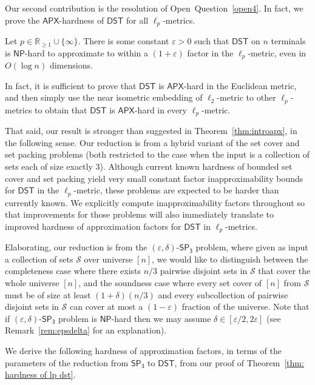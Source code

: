 \documentclass{theoretics}
\newcommand{\1}{\textbf{1}}
\newcommand{\setpT}{$\mathsf{SP_3}$\xspace}
\newcommand{\dst}{$\mathsf{DST}$\xspace}
\newcommand{\np}{$\mathsf{NP}$\xspace}
\newcommand{\apx}{$\mathsf{APX}$\xspace}
\begin{document}
 
Our second contribution is the resolution of Open~Question~\ref{open4}. In fact, we prove the \apx-hardness of \dst for all $\ell_p$-metrics. 

\begin{theorem}
   \label{thm:introapx} Let $p\in \mathbb{R}_{\ge 1}\cup\{\infty\}$. There is some constant $\varepsilon>0$ such that \dst on $n$ terminals is \np-hard to approximate to within a $(1+\varepsilon)$ factor in the $\ell_p$-metric, even in $O(\log n)$ dimensions. 
\end{theorem}

In fact, it is sufficient to prove that \dst is \apx-hard in the Euclidean metric, and then simply use the near isometric embedding of $\ell_2$-metric to other $\ell_p$-metrics \cite{Racke_2006} to obtain that  \dst is \apx-hard in every  $\ell_p$-metric. 


That said, our result is stronger than suggested in Theorem~\ref{thm:introapx}, in the following sense. Our reduction is from a hybrid variant of the set cover and set packing problems (both restricted to the case when the input is a  collection of sets each of size exactly 3). Although current known hardness of bounded set cover and set packing yield very small constant factor inapproximability bounds for \dst in the $\ell_p$-metric, these problems are expected to be harder than currently known. We explicitly compute inapproximability factors throughout so that improvements for those problems will also immediately translate to improved hardness of approximation factors for \dst in $\ell_p$-metrics.

Elaborating, our reduction is from the $(\varepsilon,\delta)$-\setpT problem, where given as input a collection of sets $\mathcal{S}$ over universe $[n]$, we would like to distinguish between the completeness case where there exists $n/3$ pairwise disjoint sets in $\mathcal{S}$ that cover the whole universe $[n]$, and the soundness case where every set cover of $[n]$ from $\mathcal{S}$ must be of size at least $(1+\delta)(n/3)$ and every subcollection of pairwise disjoint sets in $\mathcal{S}$ can cover at most a $(1-\varepsilon)$ fraction of the universe. Note that if $(\varepsilon,\delta)$-\setpT problem is \np-hard then we may assume $\delta\in [\varepsilon/2,2\varepsilon]$ (see Remark~\ref{rem:epsdelta} for an explanation). 

We derive the following hardness of approximation factors, in terms of the parameters of the reduction from \setpT to \dst, from our proof of Theorem~\ref{thm: hardness of lp dst}.
\end{document}
